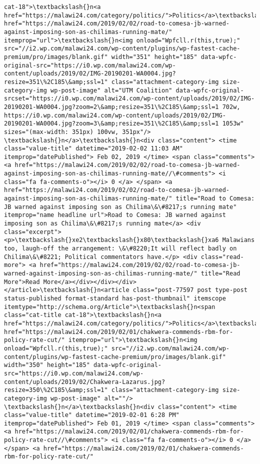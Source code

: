 \documentclass[11pt]{article}
\begin{document}
\begin{Verbatim}[commandchars=\\\{\}]
cat-18">\textbackslash{}n<a href="https://malawi24.com/category/politics/">Politics</a>\textbackslash{}n</span>\textbackslash{}n<a href="https://malawi24.com/2019/02/02/road-to-comesa-jb-warned-against-imposing-son-as-chilimas-running-mate/" itemprop="url">\textbackslash{}n<img onload="Wpfcll.r(this,true);" src="//i2.wp.com/malawi24.com/wp-content/plugins/wp-fastest-cache-premium/pro/images/blank.gif" width="351" height="185" data-wpfc-original-src="https://i0.wp.com/malawi24.com/wp-content/uploads/2019/02/IMG-20190201-WA0004.jpg?resize=351\%2C185\&amp;ssl=1" class="attachment-category-img size-category-img wp-post-image" alt="UTM Coalition" data-wpfc-original-srcset="https://i0.wp.com/malawi24.com/wp-content/uploads/2019/02/IMG-20190201-WA0004.jpg?zoom=2\&amp;resize=351\%2C185\&amp;ssl=1 702w, https://i0.wp.com/malawi24.com/wp-content/uploads/2019/02/IMG-20190201-WA0004.jpg?zoom=3\&amp;resize=351\%2C185\&amp;ssl=1 1053w" sizes="(max-width: 351px) 100vw, 351px"/>   \textbackslash{}n</a>\textbackslash{}n<div class="content"> <time class="value-title" datetime="2019-02-02 11:03 AM" itemprop="datePublished"> Feb 02, 2019 </time> <span class="comments"> <a href="https://malawi24.com/2019/02/02/road-to-comesa-jb-warned-against-imposing-son-as-chilimas-running-mate//\#comments"> <i class="fa fa-comments-o"></i> 0 </a> </span> <a href="https://malawi24.com/2019/02/02/road-to-comesa-jb-warned-against-imposing-son-as-chilimas-running-mate/" title="Road to Comesa: JB warned against imposing son as Chilima\&\#8217;s running mate" itemprop="name headline url">Road to Comesa: JB warned against imposing son as Chilima\&\#8217;s running mate</a> <div class="excerpt"> <p>\textbackslash{}xe2\textbackslash{}x80\textbackslash{}xa6 Malawians too, laugh-off the arrangement: \&\#8220;It will reflect badly on Chilima\&\#8221; Political commentators have.</p> <div class="read-more"> <a href="https://malawi24.com/2019/02/02/road-to-comesa-jb-warned-against-imposing-son-as-chilimas-running-mate/" title="Read More">Read More</a></div></div></div></article>\textbackslash{}n<article class="post-77597 post type-post status-published format-standard has-post-thumbnail" itemscope itemtype="http://schema.org/Article">\textbackslash{}n<span class="cat-title cat-18">\textbackslash{}n<a href="https://malawi24.com/category/politics/">Politics</a>\textbackslash{}n</span>\textbackslash{}n<a href="https://malawi24.com/2019/02/01/chakwera-commends-rbm-for-policy-rate-cut/" itemprop="url">\textbackslash{}n<img onload="Wpfcll.r(this,true);" src="//i2.wp.com/malawi24.com/wp-content/plugins/wp-fastest-cache-premium/pro/images/blank.gif" width="350" height="185" data-wpfc-original-src="https://i0.wp.com/malawi24.com/wp-content/uploads/2019/02/Chakwera-Lazarus.jpg?resize=350\%2C185\&amp;ssl=1" class="attachment-category-img size-category-img wp-post-image" alt=""/>   \textbackslash{}n</a>\textbackslash{}n<div class="content"> <time class="value-title" datetime="2019-02-01 6:28 PM" itemprop="datePublished"> Feb 01, 2019 </time> <span class="comments"> <a href="https://malawi24.com/2019/02/01/chakwera-commends-rbm-for-policy-rate-cut//\#comments"> <i class="fa fa-comments-o"></i> 0 </a> </span> <a href="https://malawi24.com/2019/02/01/chakwera-commends-rbm-for-policy-rate-cut/" 
\end{Verbatim}
\end{document}
